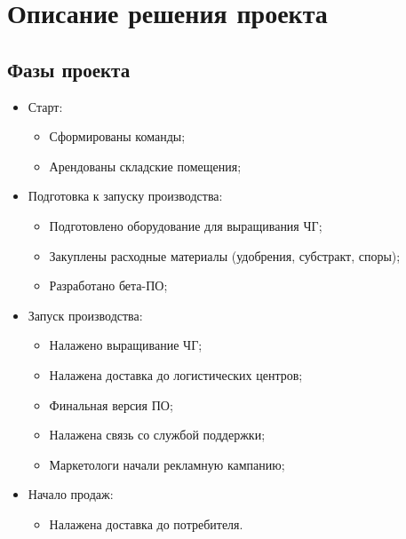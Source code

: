 \documentclass[a4paper,8pt]{article}
\begin{document}
\section{Описание решения проекта}


\subsection{Фазы проекта}

    \begin{itemize}
        \item Старт:
            \begin{itemize}
                \item Сформированы команды;
                \item Арендованы складские помещения;
            \end{itemize}

        \item Подготовка к запуску производства:
            \begin{itemize}
                \item Подготовлено оборудование для выращивания ЧГ;
                \item Закуплены расходные материалы (удобрения, субстракт, споры);
                \item Разработано бета-ПО;
            \end{itemize}


        \item Запуск производства:
            \begin{itemize}
            \item Налажено выращивание ЧГ;
            \item Налажена доставка до логистических центров;
            \item Финальная версия ПО;
            \item Налажена связь со службой поддержки;
            \item Маркетологи начали рекламную кампанию;
            \end{itemize}

        \item Начало продаж:
            \begin{itemize}
                \item Налажена доставка до потребителя.
            \end{itemize}

    \end{itemize}
\end{document}

